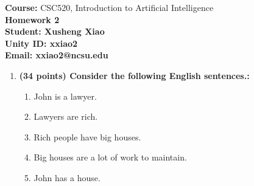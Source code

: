 \documentclass{article}%
\begin{document}
\begin{flushleft}
\textbf{Course:} CSC520, Introduction to Artificial Intelligence\\
\textbf{Homework 2}\\
\textbf{Student: Xusheng Xiao} \\
\textbf{Unity ID: xxiao2} \\
\textbf{Email: xxiao2@ncsu.edu}
\end{flushleft}

\noindent{\hrulefill}

\bigskip

\begin{enumerate}
	\item \textbf{ (34 points) Consider the following English sentences.:}
	\begin{enumerate}
	\item John is a lawyer.
    \item Lawyers are rich.
    \item Rich people have big houses.
    \item Big houses are a lot of work to maintain.
    \item John has a house.
	\end{enumerate}
     

\end{enumerate}
\end{document}

